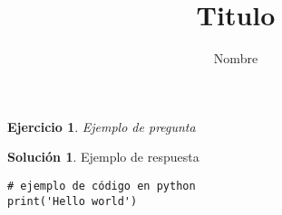 \documentclass[a4paper,11pt]{article}
\author{Nombre}
\title{Titulo}
\theoremstyle{plain} %
\newtheorem{pregunta}{Ejercicio}
\theoremstyle{definition} %
\newtheorem*{solucion}{Solución} %
\begin{document}
    \maketitle %



    \begin{pregunta}
        Ejemplo de pregunta
    \end{pregunta}

    \begin{solucion}
        Ejemplo de respuesta

        \begin{verbatim}
# ejemplo de código en python
print('Hello world')
        \end{verbatim}

    \end{solucion}
\end{document}
